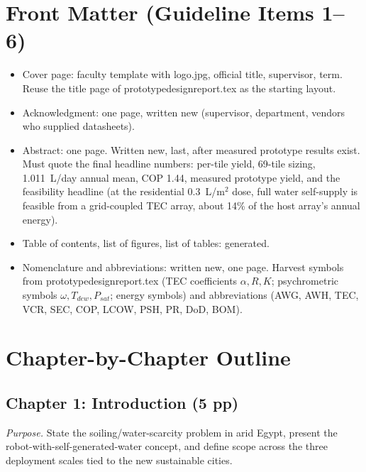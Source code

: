 \documentclass[11pt,a4paper]{article}
\newcommand{\f}[1]{{\ttfamily\def\_{\textunderscore\allowbreak}#1}}
\begin{document}
\section{Front Matter (Guideline Items 1--6)}
\begin{itemize}[nosep,leftmargin=*]
  \item Cover page: faculty template with \f{logo.jpg}, official title,
        supervisor, term. Reuse the title page of \f{prototype\_design\_report.tex}
        as the starting layout.
  \item Acknowledgment: one page, written new (supervisor, department, vendors
        who supplied datasheets).
  \item Abstract: one page. Written new, last, after measured prototype results
        exist. Must quote the final headline numbers: per-tile yield, 69-tile
        sizing, 1.011~L/day annual mean, COP 1.44, measured prototype yield, and
        the feasibility headline (at the residential 0.3~L/m$^2$ dose, full water
        self-supply is feasible from a grid-coupled TEC array, about 14\% of the
        host array's annual energy).
  \item Table of contents, list of figures, list of tables: generated.
  \item Nomenclature and abbreviations: written new, one page. Harvest symbols
        from \f{prototype\_design\_report.tex} (TEC coefficients $\alpha, R, K$;
        psychrometric symbols $\omega, T_{dew}, P_{sat}$; energy symbols) and
        abbreviations (AWG, AWH, TEC, VCR, SEC, COP, LCOW, PSH, PR, DoD, BOM).
\end{itemize}

\section{Chapter-by-Chapter Outline}

\subsection{Chapter 1: Introduction (5 pp)}
\textit{Purpose.} State the soiling/water-scarcity problem in arid Egypt, present
the robot-with-self-generated-water concept, and define scope across the three
deployment scales tied to the new sustainable cities.
\end{document}
